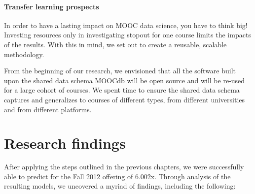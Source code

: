 \paragraph{Transfer learning prospects}
In order to have a lasting impact on MOOC data science, you have to think big! Investing resources only in investigating stopout for one course limits the impacts of the results. With this in mind, we set out to create a reusable, scalable methodology.

From the beginning of our research, we envisioned that all the software built upon the shared data schema MOOCdb will be open source and will be re-used for a large cohort of courses. We spent time to ensure the shared data schema captures and generalizes to courses of different types, from different universities and from different platforms. 

\section{Research findings}
After applying the steps outlined in the previous chapters, we were successfully able to predict \sti for the Fall 2012 offering of 6.002x. Through analysis of the resulting models, we uncovered a myriad of findings, including the following:

